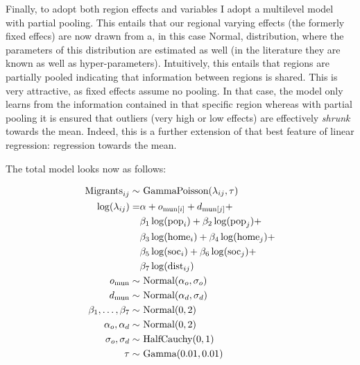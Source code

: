 \documentclass[fleqn,10pt]{SelfArx} %
\begin{document}
        Finally, to adopt both region effects and variables I adopt a
        multilevel model with partial pooling. This entails that our
        regional varying effects (the formerly fixed effecs) are now
        drawn from a, in this case Normal, distribution, where the
        parameters of this distribution are estimated as well (in the
        literature they are known as well as
        hyper-parameters). Intuitively, this entails that regions are
        partially pooled indicating that information between regions
        is shared. This is very attractive, as fixed effects assume no
        pooling. In that case, the model only learns from the information contained
        in that specific region whereas with partial pooling it is ensured that
        outliers (very high or low effects) are effectively
        \emph{shrunk} towards the mean. Indeed, this is a further
        extension of that best feature of linear regression:
        regression towards the mean.

        The total model looks now as follows:
        
        \begin{subequations}
          \begin{align} \text{Migrants}_{ij} \sim & \text{ GammaPoisson}(\lambda_{ij}, \tau) \label{outcome}\\
            \log(\lambda_{ij}) =
            & \alpha + o_{\text{mun}[i]} + d_{\text{mun}[j]} + \notag
            \\ & \beta_1 \log(\text{pop}_i) +
            \beta_2\log(\text{pop}_j) + \notag \\ & \beta_3
            \log(\text{home}_i) + \beta_4 \log(\text{home}_j) + \notag\\
            & \beta_5 \log(\text{soc}_i) + \beta_6 \log(\text{soc}_j)
            + \notag \\ & \beta_7 \log(\text{dist}_{ij}) \label{linear} \\
            o_{\text{mun}} \sim& \text{ Normal}(\alpha_o, \sigma_o) \label{muno} \\
            d_{\text{mun}} \sim& \text{ Normal}(\alpha_d, \sigma_d) \label{mund} \\
            \beta_1,\ldots, \beta_7 \sim& \text{
                                          Normal}(0,2)\\ \alpha_o, \alpha_d \sim& \text{ Normal}(0,2)\\
            \sigma_o, \sigma_d \sim& \text{ HalfCauchy}(0,1) \\ \tau
            \sim& \text{ Gamma}(0.01, 0.01)
          \end{align}
          \label{model}
        \end{subequations}
\end{document}
